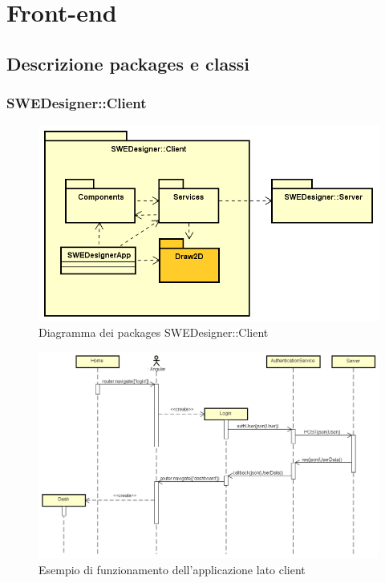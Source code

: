 \section{Front-end}

	\subsection{Descrizione packages e classi}

	\subsubsection{SWEDesigner::Client}
		\begin{figure}[h!]
			\centering
			\includegraphics[scale=0.4]{Disegnetti/Front-End.png}
			\caption{Diagramma dei packages SWEDesigner::Client}
 		\end{figure}
		\begin{figure}
			\centering
			\includegraphics[scale=0.4]{Disegnetti/SequenceDiagram.png}
			\caption{Esempio di funzionamento dell'applicazione lato client}
		\end{figure}

